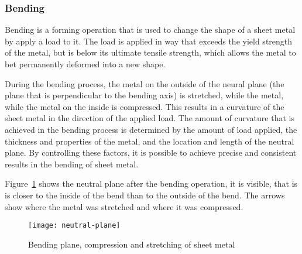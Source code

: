 
\subsubsection{Bending}
Bending is a forming operation that is used to change the shape of a sheet metal by
apply a load
to it.
The load is applied in way that exceeds the yield strength of the metal, but is below its
ultimate tensile strength, which allows the metal to bet permanently deformed into a
new shape.
\cite[p. 1]{baig_machinelearningprediction_2021}

During the bending process, the metal on the outside of the neural plane (the plane
that is
perpendicular to the bending axis) is stretched, while the metal, while the metal on
the inside
is compressed.
This results in a curvature of the sheet metal in the direction of the applied load.
\cite[p. 3]{baig_machinelearningprediction_2021}
The amount of curvature that is achieved in the bending process is determined by the
amount of
load applied, the thickness and properties of the metal, and the location and length of
the
neutral plane. By controlling these factors, it is possible to achieve precise and
consistent
results in the bending of sheet metal.

Figure~\ref{fig:neutral-plane} shows the neutral plane after the bending operation, it is
visible, that is is closer to the inside of the bend than to the outside of the bend.
The arrows show where the metal was stretched and where it was compressed.


\begin{figure}[H]
    \centering
    \texttt{[image: neutral-plane]}
    \caption{Bending plane, compression and stretching of sheet metal \cite[p.
    3]{baig_machinelearningprediction_2021}}
    \label{fig:neutral-plane}
\end{figure}

